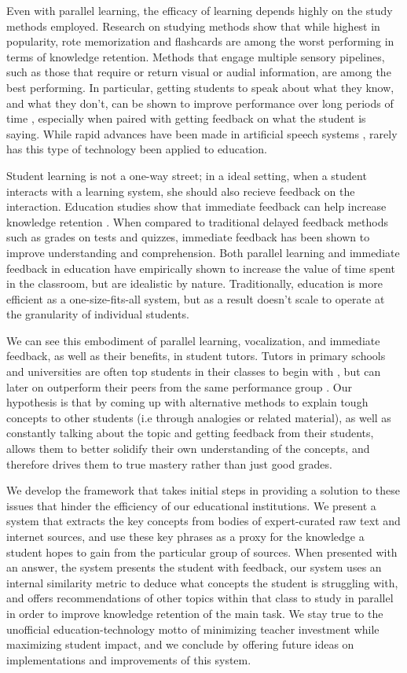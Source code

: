 \documentclass[11pt,a4paper]{article}
\begin{document}
Even with parallel learning, the efficacy of learning depends highly on the study methods employed. Research on studying methods \cite{TODO} show that while highest in popularity, rote memorization and flashcards are among the worst performing in terms of knowledge retention. Methods that engage multiple sensory pipelines, such as those that require or return visual or audial information, are among the best performing. In particular, getting students to speak about what they know, and what they don't, can be shown to improve performance over long periods of time \cite{TODO}, especially when paired with getting feedback on what the student is saying. While rapid advances have been made in artificial speech systems \cite{TODO: Both Transcribing and Understanding}, rarely has this type of technology been applied to education.

Student learning is not a one-way street; in a ideal setting, when a student interacts with a learning system, she should also recieve feedback on the interaction. Education studies show that immediate feedback can help increase knowledge retention \cite{samuels_wu}. When compared to traditional delayed feedback methods such as grades on tests and quizzes, immediate feedback has been shown to improve understanding and comprehension. Both parallel learning and immediate feedback in education have empirically shown to increase the value of time spent in the classroom, but are idealistic by nature. Traditionally, education is more efficient as a one-size-fits-all system, but as a result doesn't scale to operate at the granularity of individual students. 

We can see this embodiment of parallel learning, vocalization, and immediate feedback, as well as their benefits, in student tutors. Tutors in primary schools and universities are often top students in their classes to begin with \cite{TODO}, but can later on outperform their peers from the same performance group \cite{TODO}. Our hypothesis is that by coming up with alternative methods to explain tough concepts to other students (i.e through analogies or related material), as well as constantly talking about the topic and getting feedback from their students, allows them to better solidify their own understanding of the concepts, and therefore drives them to true mastery rather than just good grades. 

We develop the framework that takes initial steps in providing a solution to these issues that hinder the efficiency of our educational institutions. We present a system that extracts the key concepts from bodies of expert-curated raw text and internet sources, and use these key phrases as a proxy for the knowledge a student hopes to gain from the particular group of sources. When presented with an answer, the system presents the student with feedback, our system uses an internal similarity metric to deduce what concepts the student is struggling with, and offers recommendations of other topics within that class to study in parallel in order to improve knowledge retention of the main task. We stay true to the unofficial education-technology motto of minimizing teacher investment while maximizing student impact, and we conclude by offering future ideas on implementations and improvements of this system.
\end{document}
